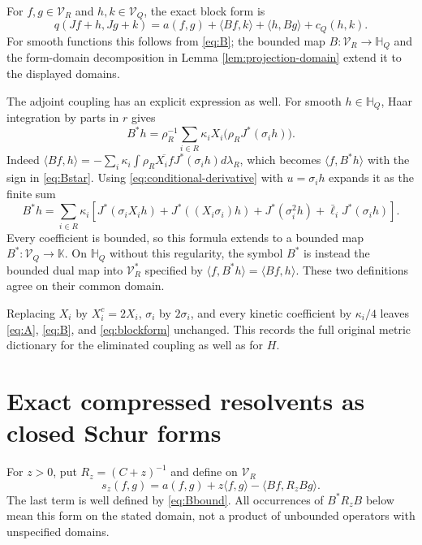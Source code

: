 \documentclass[11pt]{article}
\begin{document}
For $f,g\in\mathcal V_R$ and $h,k\in\mathcal V_Q$, the exact block
form is
\begin{equation}\label{eq:blockform}
 q(Jf+h,Jg+k)=a(f,g)+\langle Bf,k\rangle
                         +\langle h,Bg\rangle+c_Q(h,k).
\end{equation}
For smooth functions this follows from \eqref{eq:B}; the bounded map
$B:\mathcal V_R\to\mathbb H_Q$ and the form-domain decomposition in
Lemma \ref{lem:projection-domain} extend it to the displayed domains.

The adjoint coupling has an explicit expression as well. For smooth
$h\in\mathbb H_Q$, Haar integration by parts in $r$ gives
\begin{equation}\label{eq:Bstar}
 B^*h=\rho_R^{-1}\sum_{i\in R}\kappa_i
                   X_i\bigl(\rho_R J^*(\sigma_i h)\bigr).
\end{equation}
Indeed $\langle Bf,h\rangle=-\sum_i\kappa_i
\int\rho_R\overline{X_if}J^*(\sigma_ih)d\lambda_R$, which becomes
$\langle f,B^*h\rangle$ with the sign in \eqref{eq:Bstar}.
Using \eqref{eq:conditional-derivative} with $u=\sigma_i h$ expands it
as the finite sum
\[
 B^*h=\sum_{i\in R}\kappa_i
 \left[J^*(\sigma_iX_ih)+J^*((X_i\sigma_i)h)
       +J^*(\sigma_i^2h)+\bar\ell_iJ^*(\sigma_i h)\right].
\]
Every coefficient is bounded, so this formula extends to a bounded map
$B^*:\mathcal V_Q\to\mathbb K$. On $\mathbb H_Q$ without this
regularity, the symbol $B^*$ is instead the bounded dual map into
$\mathcal V_R^*$ specified by $\langle f,B^*h\rangle=\langle Bf,h\rangle$.
These two definitions agree on their common domain.

Replacing $X_i$ by $X_i^c=2X_i$, $\sigma_i$ by $2\sigma_i$, and every
kinetic coefficient by $\kappa_i/4$ leaves \eqref{eq:A}, \eqref{eq:B},
and \eqref{eq:blockform} unchanged. This records the full original
metric dictionary for the eliminated coupling as well as for $H$.

\section{Exact compressed resolvents as closed Schur forms}

For $z>0$, put $R_z=(C+z)^{-1}$ and define on $\mathcal V_R$
\begin{equation}\label{eq:Schurform}
 s_z(f,g)=a(f,g)+z\langle f,g\rangle-\langle Bf,R_zBg\rangle.
\end{equation}
The last term is well defined by \eqref{eq:Bbound}. All occurrences of
$B^*R_zB$ below mean this form on the stated domain, not a product of
unbounded operators with unspecified domains.
\end{document}
